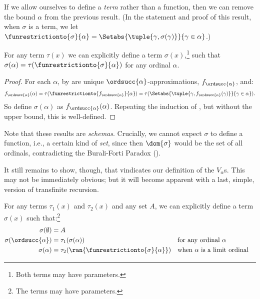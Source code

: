 \documentclass[../../../include/open-logic-section]{subfiles}
\begin{document}
If we allow ourselves to define a \emph{term} rather than a function,
then we can remove the bound $\alpha$ from the previous result. (In
the statement and proof of this result, when $\sigma$ is a term, we
let $\funrestrictionto{\sigma}{\alpha} = \Setabs{\tuple{\gamma,
\sigma(\gamma)}}{\gamma \in \alpha}$.)

\begin{thm}
For any term $\tau(x)$ we can explicitly define a term
$\sigma(x)$,\footnote{Both terms may have parameters.} such that
$\sigma(\alpha) = \tau(\funrestrictionto{\sigma}{\alpha})$ for any
ordinal $\alpha$. 	
\end{thm}

\begin{proof}
For each $\alpha$, by  are unique
$\ordsucc{\alpha}$-approximations, $f_{\ordsucc{\alpha}}$, and:
\[
	f_{\ordsucc{\alpha}}(\alpha) = 
	\tau(\funrestrictionto{f_{\ordsucc{\alpha}}}{\alpha}) = 
	\tau(\Setabs{\tuple{\gamma, f_{\ordsucc{\alpha}}(\gamma)}}{\gamma \in \alpha}).
\]
So define $\sigma(\alpha)$ as $f_{\ordsucc{\alpha}}(\alpha)$.
Repeating the induction of , but without the
upper bound, this is well-defined.
\end{proof}

Note that these results are \emph{schemas}. Crucially, we cannot
expect $\sigma$ to define a function, i.e., a certain kind of
\emph{set}, since then $\dom{\sigma}$ would be the set of all
ordinals, contradicting the Burali-Forti Paradox
().

It still remains to show, though, that 
vindicates our definition of the $V_\alpha$s. This may not be
immediately obvious; but it will become apparent with a last, simple,
version of transfinite recursion.

\begin{thm} 
For any terms $\tau_1(x)$ and $\tau_2(x)$ and any set $A$, we can
explicitly define a term $\sigma(x)$ such that:\footnote{The terms may
have parameters.}
\begin{align*}
	\sigma(\emptyset) &= A\\
	\sigma(\ordsucc{\alpha}) &= \tau_1(\sigma(\alpha)) &&
		\text{for any ordinal }\alpha\\
	\sigma(\alpha) &= \tau_2(\ran{\funrestrictionto{\sigma}{\alpha}})&&
	\text{when }\alpha\text{ is a limit ordinal}
\end{align*}
\end{thm}
\end{document}
